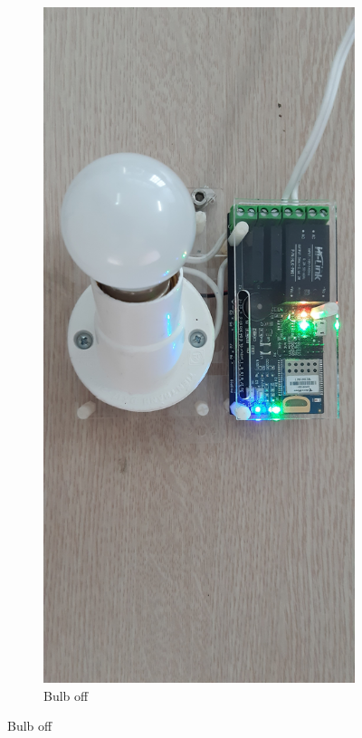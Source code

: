 \documentclass[\main/thesis.tex]{subfiles}
\begin{document}
\begin{figure}[H]
    \centering
    \begin{subfigure}[b]{0.4\linewidth}
        \centering
        \includegraphics[angle = 90, width=0.9\linewidth]{result_remote_control_off_result.jpg}
        \caption{Bulb off}
        \label{fig:result_remote_control_off_result}

\end{subfigure}
\end{figure}
\end{document}
